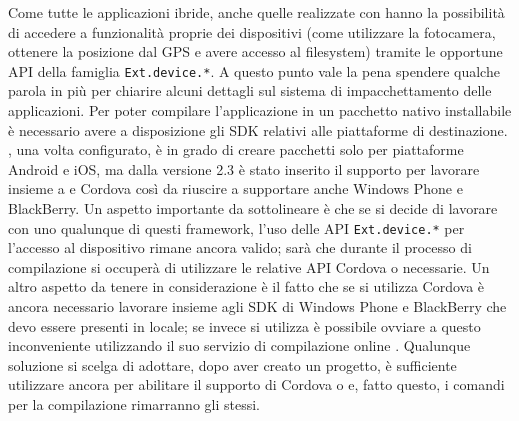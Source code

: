            Come tutte le applicazioni ibride, anche quelle realizzate con
            \senchat{} hanno la possibilità di accedere a funzionalità proprie
            dei dispositivi (come utilizzare la fotocamera, ottenere la posizione
            dal GPS e avere accesso al filesys\-tem) tramite le opportune API
            della famiglia \verb|Ext.device.*|. A questo punto vale la pena
            spendere qualche parola in più per chiarire alcuni dettagli sul
            sistema di impacchettamento delle applicazioni. Per poter compilare
            l'applicazione in un pacchetto nativo installabile è necessario
            avere a disposizione gli SDK relativi alle piattaforme di destinazione.
            \senchacmd{}, una volta configurato, è in grado di creare pacchetti
            solo per piattaforme Android e iOS, ma dalla versione 2.3 è stato
            inserito il supporto per lavorare insieme a \pg{} e Cordova così da
            riuscire a supportare anche Windows Phone e BlackBerry. Un aspetto
            importante da sottolineare è che se si decide di lavorare con uno
            qualunque di questi frame\-work, l'uso delle API \verb|Ext.device.*| per
            l'accesso al dispositivo rimane ancora valido; sarà \senchacmd{} che
            durante il processo di compilazione si occuperà di utilizzare le
            relative API Cordova o \pg{} necessarie. Un altro aspetto da
            tenere in considerazione è il fatto che se si utilizza Cordova è
            ancora necessario lavorare insieme agli SDK di Windows Phone e BlackBerry
            che devo essere presenti in locale; se invece si utilizza \pg{} è
            possibile ovviare a questo inconveniente utilizzando il suo servizio
            di compilazione online \pgb{}. Qualunque soluzione si scelga di
            adottare, dopo aver creato un progetto, è sufficiente utilizzare
            ancora \senchacmd{} per abilitare il supporto di Cordova o \pg{} e,
            fatto questo, i comandi per la compilazione rimarranno gli stessi.


